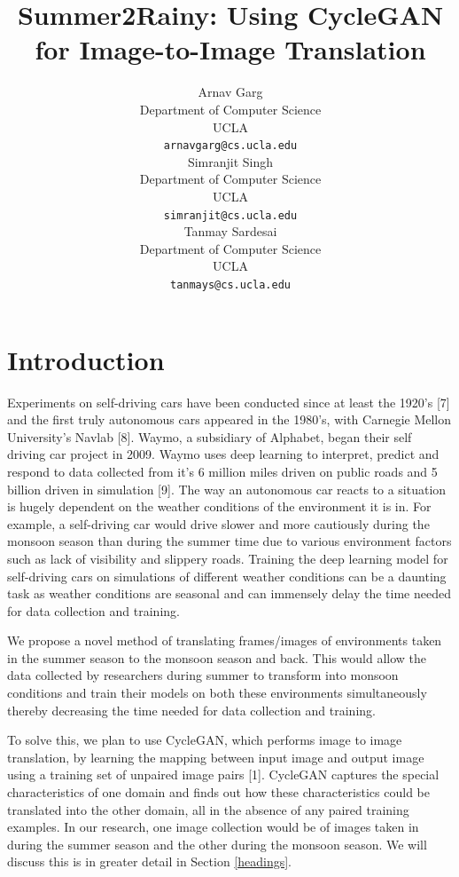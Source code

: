 \documentclass{article}
\title{Summer2Rainy: Using CycleGAN for Image-to-Image Translation}
\author{
  Arnav Garg \\
  Department of Computer Science\\
  UCLA\\
  \texttt{arnavgarg@cs.ucla.edu} \\
  \And
  Simranjit Singh \\
  Department of Computer Science\\
  UCLA\\
  \texttt{simranjit@cs.ucla.edu} \\
   \And
  Tanmay Sardesai \\
  Department of Computer Science\\
  UCLA\\
  \texttt{tanmays@cs.ucla.edu} \\
}
\begin{document}

\maketitle

\begin{abstract}
 


\end{abstract}

\section{Introduction}

Experiments on self-driving cars have been conducted since at least the 1920’s [7]
and the first truly autonomous cars appeared in the 1980’s, with Carnegie 
Mellon University’s Navlab [8]. Waymo, a subsidiary of Alphabet, 
began their self driving car project in 2009. Waymo uses deep learning 
to interpret, predict and respond to data collected from it’s 6 million 
miles driven on public roads and 5 billion driven in simulation [9]. 
The way an autonomous car reacts to a situation is hugely dependent on 
the weather conditions of the environment it is in. For example, a 
self-driving car would drive slower and more cautiously during the 
monsoon season than during the summer time due to various environment
 factors such as lack of visibility and slippery roads. 
 Training the deep learning model for self-driving cars on 
 simulations of different weather conditions can be a daunting 
 task as weather conditions are seasonal and can immensely delay 
 the time needed for data collection and training.

We propose a novel method of translating frames/images of environments 
taken in the summer season to the monsoon season and back. 
This would allow the data collected by researchers during 
summer to transform into monsoon conditions and train their 
models on both these environments simultaneously thereby 
decreasing the time needed for data collection and training.

To solve this, we plan to use CycleGAN, which performs image to image 
translation, by learning the mapping between input image and output image 
using a training set of unpaired image pairs [1]. CycleGAN captures the 
special characteristics of one domain and finds out how these 
characteristics could be translated into the other domain, all in the 
absence of any paired training examples. In our research, one image 
collection would be of images taken in during the summer season and 
the other during the monsoon season. We will discuss this is in greater 
detail in Section \ref{headings}.  
\end{document}
